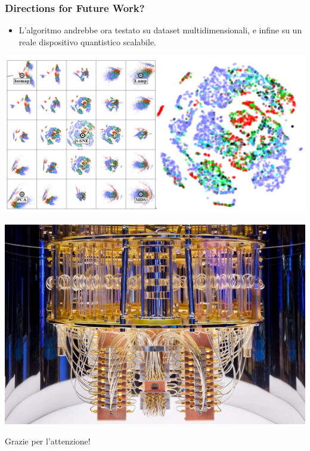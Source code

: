 \documentclass{beamer}
\begin{document}
\begin{frame}
  \frametitle{Directions for Future Work?}
  \begin{itemize}
    \item L'algoritmo andrebbe ora testato su dataset multidimensionali, e infine su un reale dispositivo quantistico scalabile.
  \end{itemize}
  \vspace{0.8cm}

  \begin{minipage}{0.5\textwidth}
    \centering
    \includegraphics[width=\textwidth]{images/multi.png}
\end{minipage}%
\begin{minipage}{0.5\textwidth}
    \centering
    \includegraphics[width=\textwidth]{images/device.png}
\end{minipage}
\end{frame}

\begin{frame}
\centering Grazie per l'attenzione!

\end{frame}
\end{document}
